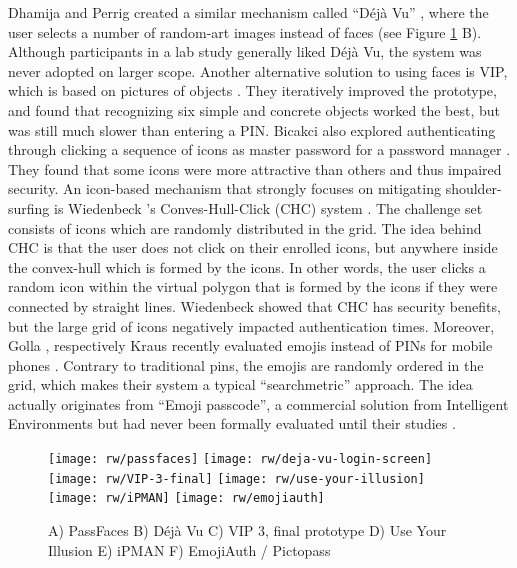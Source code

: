 	Dhamija and Perrig created a similar mechanism called ``Déjà Vu'' \cite{Dhamija2000DejaVu}, where the user selects a number of random-art images instead of faces (see Figure \ref{fig:rw:searchmetric} B). Although participants in a lab study generally liked Déjà Vu, the system was never adopted on larger scope. Another alternative solution to using faces is VIP, which is based on pictures of objects \cite{DeAngeli2002VIP, DeAngeli2005PictureThousandWords}. They iteratively improved the prototype, and found that recognizing six simple and concrete objects worked the best, but was still much slower than entering a PIN. Bicakci \etal also explored authenticating through clicking a sequence of icons as master password for a password manager \cite{Bicakci2011PWMIconBased}. They found that some icons were more attractive than others and thus impaired security. An icon-based mechanism that strongly focuses on mitigating shoulder-surfing is Wiedenbeck \etal's Conves-Hull-Click (CHC) system \cite{Wiedenbeck2006ConvexHull}. The challenge set consists of icons which are randomly distributed in the grid. The idea behind CHC is that the user does not click on their enrolled icons, but anywhere inside the convex-hull which is formed by the icons. In other words, the user clicks a random icon within the virtual polygon that is formed by the icons if they were connected by straight lines. Wiedenbeck \etal showed that CHC has security benefits, but the large grid of icons negatively impacted authentication times. Moreover, Golla \etal, respectively Kraus \etal recently evaluated emojis instead of PINs for mobile phones \cite{Golla2017EmojiAuth, Kraus2017Emoji}. Contrary to traditional pins, the emojis are randomly ordered in the grid, which makes their system a typical ``searchmetric'' approach. The idea actually originates from ``Emoji passcode'', a commercial solution from Intelligent Environments but had never been formally evaluated until their studies . 
	
	\begin{figure}[htbp]
		\centering
		\texttt{[image: rw/passfaces]}
		\texttt{[image: rw/deja-vu-login-screen]}
		\texttt{[image: rw/VIP-3-final]}
		\texttt{[image: rw/use-your-illusion]}
		\texttt{[image: rw/iPMAN]}
		\texttt{[image: rw/emojiauth]}
		\caption{\label{fig:rw:searchmetric} A) PassFaces B) Déjà Vu C) VIP 3, final prototype D) Use Your Illusion E) iPMAN F) EmojiAuth / Pictopass  }
	\end{figure}
	

